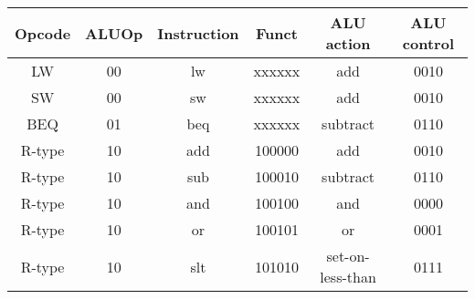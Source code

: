 \begin{tabular}[t]{cccccc}
    \toprule
    Opcode & ALUOp & Instruction & Funct    & ALU action       & ALU control \\
    \midrule
    LW     & {00}  & {lw}        & {xxxxxx} & add              & {0010}      \\
    SW     & {00}  & {sw}        & {xxxxxx} & add              & {0010}      \\
    BEQ    & {01}  & {beq}       & {xxxxxx} & subtract         & {0110}      \\
    R-type & {10}  & {add}       & {100000} & add              & {0010}      \\
    R-type & {10}  & {sub}       & {100010} & subtract         & {0110}      \\
    R-type & {10}  & {and}       & {100100} & and              & {0000}      \\
    R-type & {10}  & {or}        & {100101} & or               & {0001}      \\
    R-type & {10}  & {slt}       & {101010} & set-on-less-than & {0111}      \\
    \bottomrule
\end{tabular}
